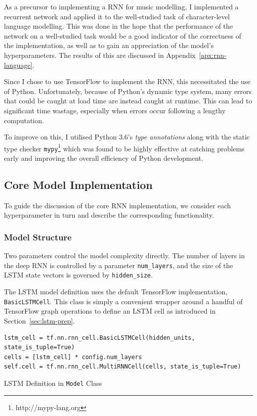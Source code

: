 \documentclass[12pt,a4paper,twoside,openright]{report}
\begin{document}
As a precursor to implementing a RNN for music modelling, I implemented a
recurrent network and applied it to the well-studied task of character-level
language modelling. This was done in the hope that the performance of the
network on a well-studied task would be a good indicator of the correctness of
the implementation, as well as to gain an appreciation of the model's
hyperparameters. The results of this are discussed in
Appendix~\ref{apx:rnn-language}.

Since I chose to use TensorFlow to implement the RNN, this necessitated the use
of Python. Unfortunately, because of Python's dynamic type system, many errors
that could be caught at load time are instead caught at runtime. This can lead
to significant time wastage, especially when errors occur following a lengthy
computation. 

To improve on this, I utilised Python 3.6's \emph{type annotations} along with
the static type checker \texttt{mypy}\footnote{http://mypy-lang.org} which was
found to be highly effective at catching problems early and improving the
overall efficiency of Python development.

\subsection{Core Model Implementation}

To guide the discussion of the core RNN implementation, we consider each
hyperparameter in turn and describe the corresponding functionality.

\subsubsection{Model Structure}

Two parameters control the model complexity directly. The number of layers in
the deep RNN is controlled by a parameter \texttt{num\_layers}, and the size of
the LSTM state vectors is governed by \texttt{hidden\_size}.

The LSTM model definition uses the default TensorFlow implementation,
\texttt{BasicLSTMCell}. This class is simply a convenient wrapper around a
handful of TensorFlow graph operations to define an LSTM cell as introduced in
Section~\ref{sec:lstm-prep}. 

\begin{listing}
  \begin{verbatim}
lstm_cell = tf.nn.rnn_cell.BasicLSTMCell(hidden_units, state_is_tuple=True)
cells = [lstm_cell] * config.num_layers
self.cell = tf.nn.rnn_cell.MultiRNNCell(cells, state_is_tuple=True)
  \end{verbatim}
  \caption{LSTM Definition in \texttt{Model} Class}
\end{listing}
\end{document}
